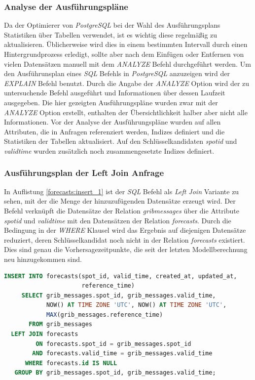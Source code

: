 \subsubsection{Analyse der Ausführungspläne}
Da der Optimierer von \textit{PostgreSQL} bei der Wahl des
Ausführungsplans Statistiken über Tabellen verwendet, ist es wichtig
diese regelmäßig zu aktualisieren. Üblicherweise wird dies in einem
bestimmten Intervall durch einen Hintergrundprozess erledigt, sollte
aber nach dem Einfügen oder Entfernen von vielen Datensätzen manuell
mit dem \textit{ANALYZE} Befehl durchgeführt werden. Um den
Ausführunsplan eines \textit{SQL} Befehls in \textit{PostgreSQL}
anzuzeigen wird der \textit{EXPLAIN} Befehl benutzt. Durch die Angabe
der \textit{ANALYZE} Option wird der zu untersuchende Befehl
ausgeführt und Informationen über dessen Laufzeit ausgegeben. Die hier
gezeigten Ausführungspläne wurden zwar mit der \textit{ANALYZE} Option
erstellt, enthalten der Übersichtlichkeit halber aber nicht alle
Informationen. Vor der Analyse der Ausführungspläne wurden auf allen
Attributen, die in Anfragen referenziert werden, Indizes definiert und
die Statistiken der Tabellen aktualisiert. Auf den Schlüsselkandidaten
\textit{spot\textunderscore id} und \textit{valid\textunderscore time}
wurden zusätzlich noch zusammengesetzte Indizes definiert.

\subsubsection{Ausführungsplan der Left Join Anfrage}
In Auflistung \ref{forecasts:insert_1} ist der \textit{SQL} Befehl als
\textit{Left Join} Variante zu sehen, mit der die Menge der
hinzuzufügenden Datensätze erzeugt wird. Der Befehl verknüpft die
Datensätze der Relation \textit{grib\textunderscore messages} über die
Attribute \textit{spot\textunderscore id} und
\textit{valid\textunderscore time} mit den Datensätzen der Relation
\textit{forecasts}. Durch die Bedingung in der \textit{WHERE} Klausel
wird das Ergebnis auf diejenigen Datensätze reduziert, deren
Schlüsselkandidat noch nicht in der Relation \textit{forecasts}
existiert. Dies sind genau die Vorhersagezeitpunkte, die seit der
letzten Modellberechnung neu hinzugekommen sind.

\begin{lstlisting}[captionpos=b, caption=Hinzufügen von Datensätze mittels Left Join, label=forecasts:insert_1, language=SQL]
INSERT INTO forecasts(spot_id, valid_time, created_at, updated_at, 
                      reference_time)
     SELECT grib_messages.spot_id, grib_messages.valid_time, 
            NOW() AT TIME ZONE 'UTC', NOW() AT TIME ZONE 'UTC', 
            MAX(grib_messages.reference_time)
       FROM grib_messages
  LEFT JOIN forecasts
         ON forecasts.spot_id = grib_messages.spot_id
        AND forecasts.valid_time = grib_messages.valid_time
      WHERE forecasts.id IS NULL
   GROUP BY grib_messages.spot_id, grib_messages.valid_time;
\end{lstlisting}


